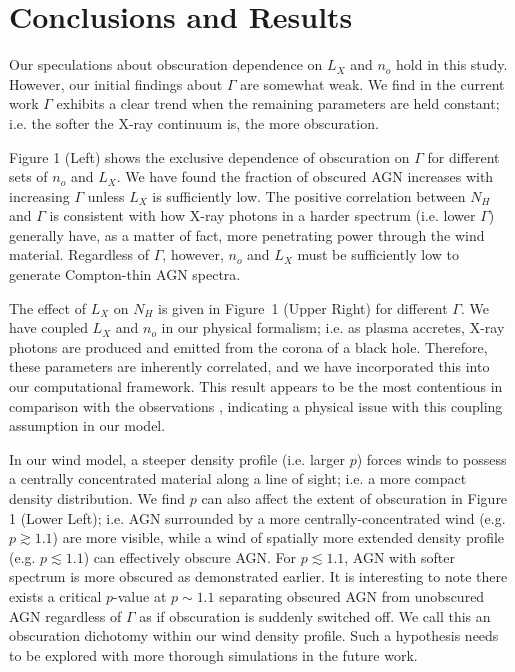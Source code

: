 \documentclass[12pt,preprint]{aastex631}
\begin{document}
\section{Conclusions and Results}

Our speculations about obscuration dependence on $L_X$ and $n_o$ hold in this study.  However, our initial findings about $\Gamma$ are somewhat weak. We find in the current work $\Gamma$ exhibits a clear trend when the remaining parameters are held constant; i.e. the softer the X-ray continuum is, the more obscuration.

Figure 1 (Left)  shows the exclusive dependence of obscuration on $\Gamma$ for different sets of $n_o$ and $L_X$. We have found the fraction of obscured AGN increases with increasing $\Gamma$ unless $L_X$ is sufficiently low. The positive correlation between $N_H$ and $\Gamma$ is consistent with how X-ray photons in a harder spectrum (i.e. lower $\Gamma$) generally have, as a matter of fact, more penetrating power through the wind material.  Regardless of $\Gamma$, however, $n_o$ and $L_X$ must be sufficiently low to generate Compton-thin AGN spectra.

The effect of $L_X$ on $N_H$ is given in Figure~1 (Upper Right) for different $\Gamma$. We have coupled $L_X$ and $n_o$ in our physical formalism; i.e. as plasma accretes, X-ray photons are produced and emitted from the corona of a black hole. Therefore, these parameters are inherently correlated, and we have incorporated this into our computational framework. This result appears to be the most contentious in comparison with the observations \citep[e.g.][]{Ueda03}, indicating a physical issue with this coupling assumption in our model. 

In our wind model, a steeper density profile (i.e. larger $p$) forces winds to possess a centrally concentrated material along a line of sight; i.e. a more compact density distribution.  We find $p$ can also affect the extent of obscuration in Figure 1 (Lower Left); i.e. AGN surrounded by a more centrally-concentrated wind (e.g. $p \gtrsim 1.1$) are more visible, while a wind of spatially more extended density profile (e.g. $p \lesssim 1.1$) can effectively obscure AGN. For $p \lesssim 1.1$, AGN with softer spectrum is more obscured as demonstrated earlier. It is interesting to note there exists a critical $p$-value at $p \sim 1.1$ separating obscured AGN from unobscured AGN regardless of $\Gamma$ as if obscuration is suddenly switched off.  We call this an obscuration dichotomy within our wind density profile. Such a hypothesis needs to be explored with more thorough simulations in the future work.   
\end{document}
